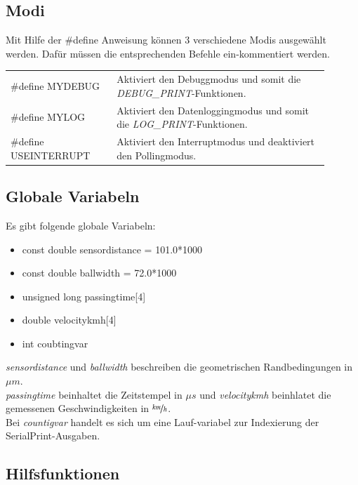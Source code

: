 \clearpage
\subsection{Modi}
Mit Hilfe der \#define Anweisung können 3 verschiedene Modis ausgewählt werden. Dafür müssen die entsprechenden Befehle ein-kommentiert werden.\\

\begin{tabular}{L{0.3\linewidth} L{0.6\linewidth}}
    \#define MYDEBUG & Aktiviert den Debuggmodus und somit die \textit{DEBUG\_PRINT}-Funktionen.\\
    \#define MYLOG & Aktiviert den Datenloggingmodus und somit die \textit{LOG\_PRINT}-Funktionen.\\
    \#define USEINTERRUPT & Aktiviert den Interruptmodus und deaktiviert den Pollingmodus.\\
\end{tabular}

\subsection{Globale Variabeln}
Es  gibt folgende globale Variabeln:
\begin{itemize}
    \item const double sensordistance = 101.0*1000
    \item const double ballwidth = 72.0*1000
    \item unsigned long passingtime[4]
    \item double velocitykmh[4]
    \item int coubtingvar
\end{itemize}

\textit{sensordistance} und \textit{ballwidth} beschreiben die geometrischen Randbedingungen in $\mu m$.\\
\textit{passingtime} beinhaltet die Zeitstempel in $\mu s$ und \textit{velocitykmh} beinhlatet die gemessenen Geschwindigkeiten in $\nicefrac{km}{h}$.\\
Bei \textit{countigvar} handelt es sich um eine Lauf-variabel zur Indexierung der SerialPrint-Ausgaben.


\subsection{Hilfsfunktionen}

